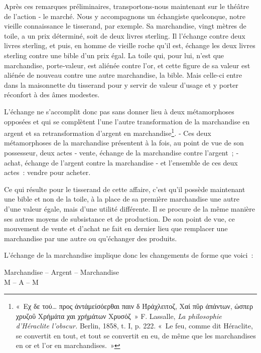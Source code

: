 \documentclass[french,twoside]{book} %
\begin{document}
Après ces remarques préliminaires, transportons‑nous maintenant sur le théâtre de l’action ‑ le marché. Nous y accompagnons un échangiste quelconque, notre vieille connaissance le tisserand, par exemple. Sa marchandise, vingt mètres de toile, a un prix déterminé, soit de deux livres sterling. Il l’échange contre deux livres sterling, et puis, en homme de vieille roche qu’il est, échange les deux livres sterling contre une bible d’un prix égal. La toile qui, pour lui, n’est que marchandise, porte‑valeur, est aliénée contre l’or, et cette figure de sa valeur est aliénée de nouveau contre une autre marchandise, la bible. Mais celle-ci entre dans la maisonnette du tisserand pour y servir de valeur d’usage et y porter réconfort à des âmes modestes.\par
L’échange ne s’accomplit donc pas sans donner lieu à deux métamorphoses opposées et qui se complètent l’une l’autre transformation de la marchandise en argent et sa retransformation d’argent en marchandise\footnote{« Eχ δε τού… προς άντάμείσόερθαι παιν δ Ήράχλειτοζ, Χαί πΰρ άπάντων, ώσπερ χρυζοΰ Χρήμάτα χαι χρήμάτων Χρυσόζ » F. Lassalle, \emph{La philosophie d’Héraclite l’obscur.} Berlin, 1858, t. I, p. 222. « Le feu, comme dit Héraclite, se convertit en tout, et tout se convertit en eu, de même que les marchandises en or et l’or en marchandises. »}. ‑ Ces deux métamorphoses de la marchandise présentent à la fois, au point de vue de son possesseur, deux actes ‑ vente, échange de la marchandise contre l’argent ; ‑ achat, échange de l’argent contre la marchandise ‑ et l’ensemble de ces deux actes : vendre pour acheter.\par
Ce qui résulte pour le tisserand de cette affaire, c’est qu’il possède maintenant une bible et non de la toile, à la place de sa première marchandise une autre d’une valeur égale, mais d’une utilité différente. Il se procure de la même manière ses autres moyens de subsistance et de production. De son point de vue, ce mouvement de vente et d’achat ne fait en dernier lieu que remplacer une marchandise par une autre ou qu’échanger des produits.\par
L’échange de la marchandise implique donc les changements de forme que voici :\par

\begin{center}
\noindent \centerline{ Marchandise – Argent – Marchandise \\
M – A – M }\par
\end{center}
\end{document}
